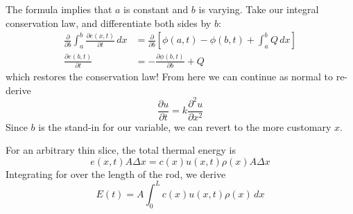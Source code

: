 \documentclass[a4paper]{article}
\begin{document}

The formula implies that \( a \) is constant and \( b \) is varying. Take our integral conservation law, and differentiate both sides by \( b \):
\begin{align*}
	\frac{\partial }{\partial b} \int^{b}_{a} \frac{\partial e \!\left( x,t \right)}{\partial t} \, dx & = \frac{\partial }{\partial b} \!\left[ \phi \!\left( a,t \right) - \phi \!\left( b,t \right) + \int^{b}_{a} Q \, dx \right] \\
	   \frac{\partial e \!\left( b,t \right)}{\partial t} & = -\frac{\partial \phi \!\left( b,t \right)}{\partial b} + Q
\end{align*}
which restores the conservation law! From here we can continue as normal to re-derive
\[
	\frac{\partial u}{\partial t} = k \frac{\partial^{2}u}{\partial x^{2}} 
\]
Since \( b \) is the stand-in for our variable, we can revert to the more customary \( x \).

\vspace{12pt}


For an arbitrary thin slice, the total thermal energy is
\[
	e \!\left( x,t \right) A \Delta x = c \!\left( x \right)u \!\left( x,t \right) \rho \!\left( x \right) A \Delta x 
\]
Integrating for over the length of the rod, we derive
\[
	E \!\left( t \right) = A \int^{L}_{0} c \!\left( x \right) u \!\left( x,t \right) \rho \!\left( x \right) \, dx  
\]
\end{document}
